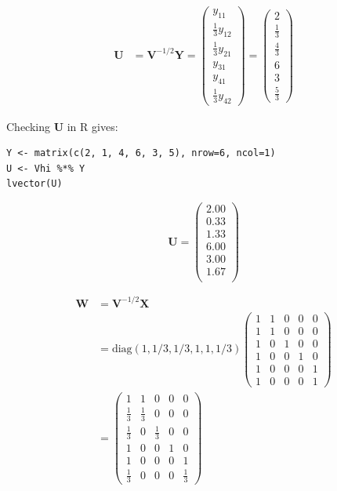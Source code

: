 \documentclass[11pt]{article}
\begin{document}
\begin{align*}
\mathbf{U} &= \mathbf{V}^{-1/2} \mathbf{Y} = 
\begin{pmatrix}
y_{11} \\ \frac{1}{3} y_{12}\\ \frac{1}{3} y_{21}\\ y_{31}\\ y_{41}\\ \frac{1}{3}y_{42}
\end{pmatrix} = 
\begin{pmatrix} 
2\\ \frac{1}{3}\\ \frac{4}{3}\\ 6\\ 3\\ \frac{5}{3}
\end{pmatrix}
\end{align*}

Checking \textbf{U} in R gives:

\begin{verbatim}
Y <- matrix(c(2, 1, 4, 6, 3, 5), nrow=6, ncol=1)
U <- Vhi %*% Y
lvector(U)
\end{verbatim}

\[
\mathbf{U} =
\begin{pmatrix}{}
  2.00 \\ 
  0.33 \\ 
  1.33 \\ 
  6.00 \\ 
  3.00 \\ 
  1.67 \\ 
  \end{pmatrix}
\]

\begin{align*}
\mathbf{W} &= \mathbf{V}^{-1/2}\mathbf{X} \\
           &= \mathrm{diag}(1,1/3,1/3,1,1,1/3)\begin{pmatrix}
1 & 1 & 0 & 0 & 0 \\
1 & 1 & 0 & 0 & 0 \\
1 & 0 & 1 & 0 & 0 \\
1 & 0 & 0 & 1 & 0 \\
1 & 0 & 0 & 0 & 1 \\
1 & 0 & 0 & 0 & 1 
\end{pmatrix}  \\
 &= 
\begin{pmatrix}{}
  1           & 1           & 0           & 0 & 0 \\
  \frac{1}{3} & \frac{1}{3} & 0           & 0 & 0 \\
  \frac{1}{3} & 0           & \frac{1}{3} & 0 & 0 \\
  1           & 0           & 0           & 1 & 0 \\
  1           & 0           & 0           & 0 & 1 \\
  \frac{1}{3} & 0           & 0           & 0 & \frac{1}{3} 
  \end{pmatrix}
\end{align*}
\end{document}
